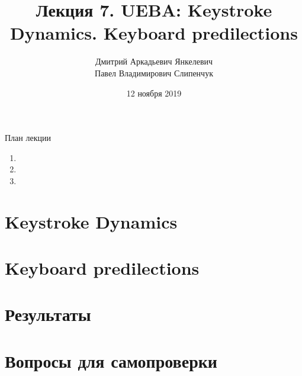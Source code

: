 


\title{Лекция 7. UEBA: Keystroke Dynamics. Keyboard predilections}

\date{12 ноября 2019}
\author{Дмитрий Аркадьевич Янкелевич \\ Павел Владимирович Слипенчук }


  \maketitle
    
\begin{frame}{План лекции}
    \begin{enumerate}
    	\item {}
		\item {}
		\item {}
	\end{enumerate}
\end{frame}

\section{Keystroke Dynamics}\label{section:kd}

\section{Keyboard predilections}\label{section:kp}

\section{Результаты}\label{section:goals}

\section{Вопросы для самопроверки}


